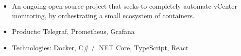 \documentclass[10pt,a4paper]{altacv}
\begin{document}


\begin{itemize}
  \item \small{An ongoing open-source project that seeks to completely automate vCenter monitoring, by orchestrating a small ecosystem of containers.}
  \item \small{Products: Telegraf, Prometheus, Grafana}
  \item \small{Technologies: Docker, C\# / .NET Core, TypeScript, React}
\end{itemize}

\divider

%




\end{document}
